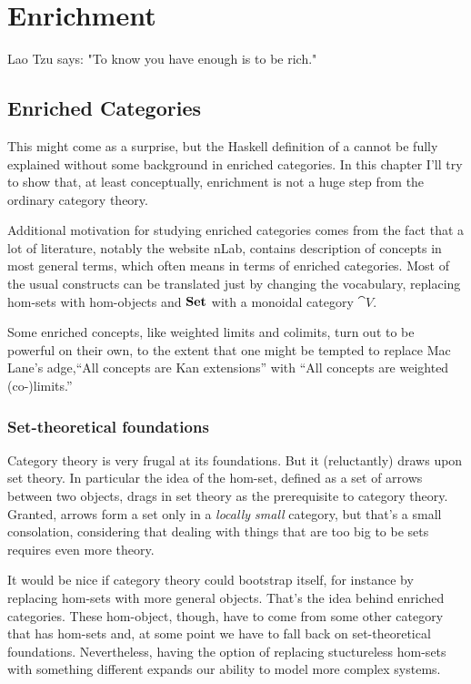 \documentclass[DaoFP]{subfiles}
\begin{document}
\setcounter{chapter}{19}

\chapter{Enrichment}

Lao Tzu says: "To know you have enough is to be rich." 

\section{Enriched Categories}

This might come as a surprise, but the Haskell definition of a  cannot be fully explained without some background in enriched categories. In this chapter I'll try to show that, at least conceptually, enrichment is not a huge step from the ordinary category theory. 

Additional motivation for studying enriched categories comes from the fact that a lot of literature, notably the website nLab, contains description of concepts in most general terms, which often means in terms of enriched categories. Most of the usual constructs can be translated just by changing the vocabulary, replacing hom-sets with hom-objects and $\mathbf{Set}$ with a monoidal category $\cat V$. 

Some enriched concepts, like weighted limits and colimits, turn out to be powerful on their own, to the extent that one might be tempted to replace Mac Lane's adge,``All concepts are Kan extensions'' with ``All concepts are weighted (co-)limits.''

\subsection{Set-theoretical foundations}

Category theory is very frugal at its foundations. But it (reluctantly) draws upon set theory. In particular the idea of the hom-set, defined as a set of arrows between two objects, drags in set theory as the prerequisite to category theory. Granted, arrows form a set only in a \emph{locally small} category, but that's a small consolation, considering that dealing with things that are too big to be sets requires even more theory. 

It would be nice if category theory could bootstrap itself, for instance by replacing hom-sets with more general objects. That's the idea behind enriched categories. These hom-object, though, have to come from some other category that has hom-sets and, at some point we have to fall back on set-theoretical foundations. Nevertheless, having the option of replacing stuctureless hom-sets with something different expands our ability to model more complex systems.
\end{document}
